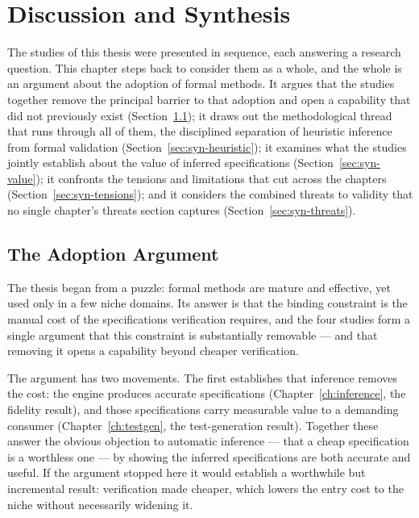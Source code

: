 \chapter{Discussion and Synthesis}
\label{ch:discussion}

The studies of this thesis were presented in sequence, each answering a research
question. This chapter steps back to consider them as a whole, and the whole is an
argument about the adoption of formal methods. It argues that the studies together
remove the principal barrier to that adoption and open a capability that did not
previously exist (Section~\ref{sec:syn-adoption}); it draws out the methodological
thread that runs through all of them, the disciplined separation of heuristic
inference from formal validation (Section~\ref{sec:syn-heuristic}); it examines
what the studies jointly establish about the value of inferred specifications
(Section~\ref{sec:syn-value}); it confronts the tensions and limitations that
cut across the chapters (Section~\ref{sec:syn-tensions}); and it considers the
combined threats to validity that no single chapter's threats section captures
(Section~\ref{sec:syn-threats}).

\section{The Adoption Argument}
\label{sec:syn-adoption}

The thesis began from a puzzle: formal methods are mature and effective, yet used
only in a few niche domains. Its answer is that the binding constraint is the
manual cost of the specifications verification requires, and the four studies form
a single argument that this constraint is substantially removable --- and that
removing it opens a capability beyond cheaper verification.

The argument has two movements. The first establishes that inference removes the
cost: the engine produces accurate specifications (Chapter~\ref{ch:inference}, the
fidelity result), and those specifications carry measurable value to a demanding
consumer (Chapter~\ref{ch:testgen}, the test-generation result). Together these
answer the obvious objection to automatic inference --- that a cheap specification
is a worthless one --- by showing the inferred specifications are both accurate and
useful. If the argument stopped here it would establish a worthwhile but
incremental result: verification made cheaper, which lowers the entry cost to the
niche without necessarily widening it.

